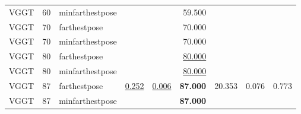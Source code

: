 \begin{table}[H]
\begin{tabular}{lrlrrrrrr}
VGGT & 60 & minfarthestpose &  &  & 59.500 &  &  &  \\
VGGT & 70 & farthestpose &  &  & 70.000 &  &  &  \\
VGGT & 70 & minfarthestpose &  &  & 70.000 &  &  &  \\
VGGT & 80 & farthestpose &  &  & \underline{80.000} &  &  &  \\
VGGT & 80 & minfarthestpose &  &  & \underline{80.000} &  &  &  \\
VGGT & 87 & farthestpose & \underline{0.252} & \underline{0.006} & \textbf{87.000} & 20.353 & 0.076 & 0.773 \\
VGGT & 87 & minfarthestpose &  &  & \textbf{87.000} &  &  &  \\
\bottomrule
\end{tabular}
\end{table}